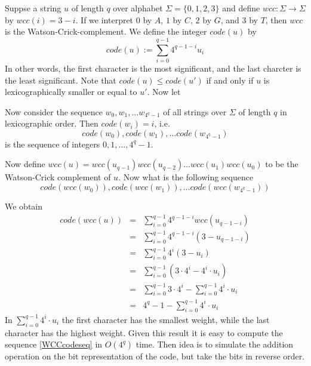 \documentclass[12pt]{article}
\begin{document}
Suppse a string \(u\) of length \(q\) over alphabet \(\Sigma=\{0,1,2,3\}\) and 
define \(wcc:\Sigma\to\Sigma\) by \(wcc(i)=3-i\). If we interpret
\(0\) by \(A\), \(1\) by \(C\), \(2\) by \(G\), and \(3\) by \(T\),
then \(wcc\) is the Watson-Crick-complement. We define the integer \(code(u)\)
by
\[code(u):=\sum_{i=0}^{q-1}4^{q-1-i}u_{i}\]
In other words, the first character is the most significant, and the last
charcter is the least significant.
Note that \(code(u)\leq code(u')\) if and only if \(u\) is 
lexicographically smaller or equal to \(u'\). Now let

Now consider the sequence \(w_{0},w_{1},\ldots w_{4^{q}-1}\) of all strings
over \(\Sigma\) of length \(q\) in lexicographic order. Then 
\(code(w_{i})=i\), i.e.\
\[code(w_{0}),code(w_{1}),\ldots code(w_{4^{q}-1})\]
is the sequence of integers \(0,1,\ldots,4^{q}-1\).

Now define \(wcc(u)=wcc(u_{q-1})wcc(u_{q-2})\ldots wcc(u_{1})wcc(u_{0})\)
to be the Watson-Crick complement of \(u\). Now what is the following sequence
\begin{equation}
code(wcc(w_{0})),code(wcc(w_{1})),\ldots code(wcc(w_{4^{q}-1}))\label{WCCcodeseq}
\end{equation}

We obtain
\begin{eqnarray*}
code(wcc(u))&=&\sum_{i=0}^{q-1}4^{q-1-i}wcc(u_{q-1-i})\\
            &=&\sum_{i=0}^{q-1}4^{q-1-i}(3-u_{q-1-i})\\
            &=&\sum_{i=0}^{q-1}4^{i}(3-u_{i})\\
            &=&\sum_{i=0}^{q-1}(3\cdot 4^{i}-4^{i}\cdot u_{i})\\
            &=&\sum_{i=0}^{q-1}3\cdot 4^{i}-\sum_{i=0}^{q-1}4^{i}\cdot u_{i}\\
            &=&4^{q}-1-\sum_{i=0}^{q-1}4^{i}\cdot u_{i}
\end{eqnarray*}
In \(\sum_{i=0}^{q-1}4^{i}\cdot u_{i}\) the first character 
has the smallest weight, while the last character has the highest weight. 
Given this result it is easy to compute the sequence \ref{WCCcodeseq} in
\(O(4^{q})\) time. Then idea is to simulate the addition operation on 
the bit representation of the code, but take the bits in reverse order.
\end{document}
